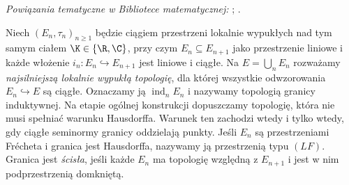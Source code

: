 \noindent\emph{Powiązania tematyczne w Bibliotece matematycznej:} ; .


\begin{definicja}
\label{def:LF18}
Niech $(E_n,\tau_n)_{n\ge1}$ będzie ciągiem przestrzeni
lokalnie wypukłych nad tym samym ciałem $\K\in\{\R,\C\}$,
przy czym $E_n\subseteq E_{n+1}$ jako przestrzenie liniowe
i każde włożenie
$i_n:E_n\hookrightarrow E_{n+1}$ jest liniowe i ciągłe.
Na $E=\bigcup_nE_n$ rozważamy \emph{najsilniejszą lokalnie
wypukłą topologię}, dla której wszystkie odwzorowania
$E_n\hookrightarrow E$ są ciągłe. Oznaczamy ją
$\operatorname{ind}_n E_n$ i nazywamy topologią granicy induktywnej.
Na etapie ogólnej konstrukcji dopuszczamy topologię,
która nie musi spełniać warunku Hausdorffa.
Warunek ten zachodzi wtedy i tylko wtedy, gdy ciągłe
seminormy granicy oddzielają punkty. Jeśli $E_n$ są
przestrzeniami Frécheta i granica jest Hausdorffa,
nazywamy ją przestrzenią typu $(LF)$.
Granica jest \emph{ścisła}, jeśli
każde $E_n$ ma topologię względną z $E_{n+1}$ i jest w nim
podprzestrzenią domkniętą.
\end{definicja}

